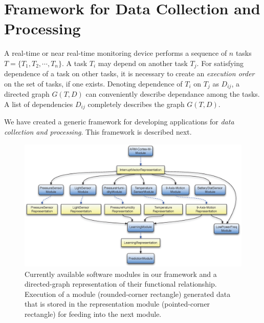 \documentclass{IEEEtran}
\begin{document}




\section{Framework for Data Collection and Processing}
\label{sec:framework}

A real-time or near real-time monitoring device performs a sequence of $n$ tasks $T = \{ T_1, T_2,\cdots,T_n\}$. A task $T_i$ may depend on another task $T_j$.  For satisfying dependence of a task on other tasks, it is necessary to create an \emph{execution order} on the set of tasks, if one exists. Denoting dependence of $T_i$ on $T_j$ as $D_{ij}$, a directed graph $G(T,D)$ can conveniently describe dependance among the tasks. A list of dependencies $D_{ij}$ completely describes the graph $G(T,D)$.
\par
We have created a generic framework for developing applications for \emph{data collection and processing}. This framework is described next.

\begin{figure}[!t]
\centering
\includegraphics[width=\textwidth]{figures/graph_structure_def-crop3.eps}
\caption{Currently available software modules in our framework and a directed-graph representation of their functional relationship. Execution of a module (rounded-corner rectangle) generated data that is stored in the representation module (pointed-corner rectangle) for feeding into the next module.}
 \label{fig:framework}
\end{figure}
\end{document}
